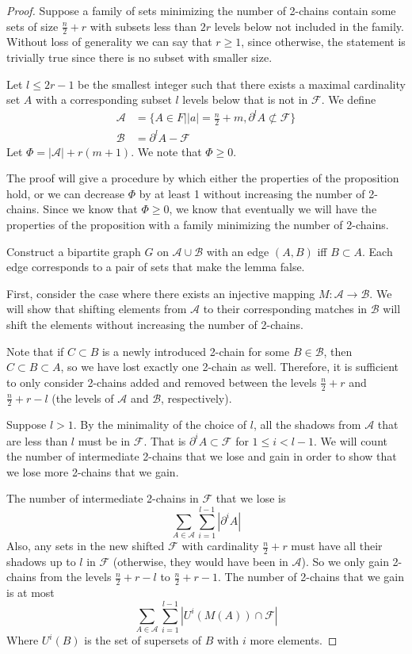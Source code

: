 \documentclass[12pt]{article}
\theoremstyle{plain}
\theoremstyle{definition}
\theoremstyle{remark}
\newcommand{\F}{\mathcal{F}}
\newcommand{\A}{\mathcal{A}}
\newcommand{\B}{\mathcal{B}}
\begin{document}
\begin{proof} 
Suppose a family of sets minimizing the number of 2-chains contain some sets of size $\frac{n}{2} + r$ with subsets less than $2r$ levels below not included in the family. Without loss of generality we can say that $r \geq 1$, since otherwise, the statement is trivially true since there is no subset with smaller size. 

Let $l \leq 2r-1$ be the smallest integer such that there exists a maximal cardinality set $A$ with a corresponding subset $l$ levels below that is not in $\F$. We define
\begin{align*}
\A &= \{A \in F| \lvert a \rvert = \frac{n}{2}+m, \partial^l A \not\subset \F \}\\
\B &= \partial^l A - \F
\end{align*}
Let $\Phi = |\A| + r(m+1)$. We note that $\Phi \geq 0$. 

The proof will give a procedure by which either the properties of the proposition hold, or we can decrease $\Phi$ by at least 1 without increasing the number of 2-chains. Since we know that $\Phi \geq 0$, we know that eventually we will have the properties of the proposition with a family minimizing the number of 2-chains.

Construct a bipartite graph $G$ on $\A \cup \B$ with an edge $(A,B)$ iff $B \subset A$. Each edge corresponds to a pair of sets that make the lemma false.

First, consider the case where there exists an injective mapping $M: \A \to \B$. We will show that shifting elements from $\A$ to their corresponding matches in $\B$ will shift the elements without increasing the number of 2-chains.

Note that if $C \subset B$ is a newly introduced 2-chain for some $B \in \B$, then $C \subset B \subset A$, so we have lost exactly one 2-chain as well. Therefore, it is sufficient to only consider 2-chains added and removed between the levels $\frac{n}{2} + r$ and $\frac{n}{2} + r - l$ (the levels of $\A$ and $\B$, respectively).

Suppose $l > 1$. By the minimality of the choice of $l$, all the shadows from $\A$ that are less than $l$ must be in $\F$. That is $\partial^i A \subset \F$ for $1 \leq i < l -1$. We will count the number of intermediate 2-chains that we lose and gain in order to show that we lose more 2-chains that we gain.

The number of intermediate 2-chains in $\F$ that we lose is
\[ \sum_{A \in \A}\sum_{i = 1}^{l-1} |\partial^i A | \]
Also, any sets in the new shifted $\F$ with cardinality $\frac{n}{2} + r$ must have all their shadows up to $l$ in $\F$ (otherwise, they would have been in $\A$). So we only gain 2-chains from the levels $\frac{n}{2} + r - l$ to $\frac{n}{2} + r - 1$. The number of 2-chains that we gain is at most
\[\sum_{A\in \A}\sum_{i = 1}^{l-1} |U^i(M(A)) \cap \F| \]
Where $U^i(B)$ is the set of supersets of $B$ with $i$ more elements.


\end{proof}
\end{document}
